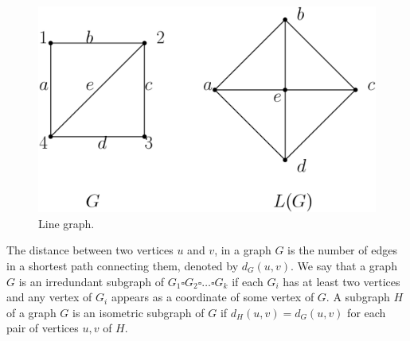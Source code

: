\documentclass[12pt,a4paper,titlepage,openany]{report}
\begin{document}
\begin{figure}[h]
\begin{center}
\includegraphics[width=0.7\linewidth]{figures/linegraph.png}
\end{center}
\caption{Line graph.}\label{linegraph}
\end{figure}
\medskip
 The distance between two vertices $u$ and $v$, in a graph $G$ is the number of edges in a shortest path connecting them, denoted by $d_G(u,v)$.
We say that a graph $G$ is an irredundant subgraph of
$G_1\square G_2\square \ldots \square G_k$ if each $G_i$ has at least two vertices and any vertex of $G_i$ appears as a coordinate of some vertex of $G$. A subgraph $H$ of a graph $G$ is an isometric subgraph of $G$ if $d_H(u, v)=d_G(u, v)$ for each pair of vertices $u , v$ of $H$. 
\medskip
\end{document}

